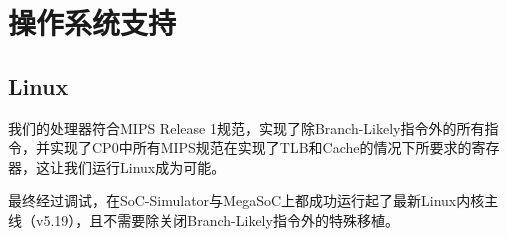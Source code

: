 \chapter{操作系统支持}

\section{Linux}

我们的处理器符合MIPS Release 1规范，实现了除Branch-Likely指令外的所有指令，并实现了CP0中所有MIPS规范在实现了TLB和Cache的情况下所要求的寄存器，这让我们运行Linux成为可能。

最终经过调试，在SoC-Simulator与MegaSoC上都成功运行起了最新Linux内核主线（v5.19），且不需要除关闭Branch-Likely指令外的特殊移植。


